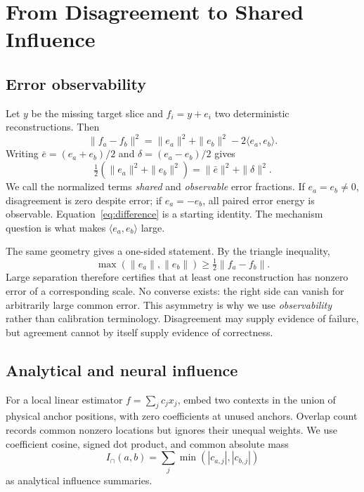 \documentclass[10pt,twocolumn,letterpaper]{article}
\begin{document}
\section{From Disagreement to Shared Influence}
\subsection{Error observability}
Let $y$ be the missing target slice and $f_i=y+e_i$ two deterministic reconstructions. Then
\begin{equation}
 \|f_a-f_b\|^2=\|e_a\|^2+\|e_b\|^2-2\langle e_a,e_b\rangle .
 \label{eq:difference}
\end{equation}
Writing $\bar e=(e_a+e_b)/2$ and $\delta=(e_a-e_b)/2$ gives
\begin{equation}
 \tfrac12(\|e_a\|^2+\|e_b\|^2)=\|\bar e\|^2+\|\delta\|^2 .
 \label{eq:decomp}
\end{equation}
We call the normalized terms \emph{shared} and \emph{observable} error fractions. If $e_a=e_b\neq0$, disagreement is zero despite error; if $e_a=-e_b$, all paired error energy is observable. Equation~\ref{eq:difference} is a starting identity. The mechanism question is what makes $\langle e_a,e_b\rangle$ large.

The same geometry gives a one-sided statement. By the triangle inequality,
\begin{equation}
 \max(\|e_a\|,\|e_b\|)\geq \tfrac12\|f_a-f_b\| .
 \label{eq:onesided}
\end{equation}
Large separation therefore certifies that at least one reconstruction has nonzero error of a corresponding scale. No converse exists: the right side can vanish for arbitrarily large common error. This asymmetry is why we use \emph{observability} rather than calibration terminology. Disagreement may supply evidence of failure, but agreement cannot by itself supply evidence of correctness.

\subsection{Analytical and neural influence}
For a local linear estimator $f=\sum_j c_jx_j$, embed two contexts in the union of physical anchor positions, with zero coefficients at unused anchors. Overlap count records common nonzero locations but ignores their unequal weights. We use coefficient cosine, signed dot product, and common absolute mass
\begin{equation}
 I_{\cap}(a,b)=\sum_j\min(|c_{a,j}|,|c_{b,j}|)
 \label{eq:mass}
\end{equation}
as analytical influence summaries.
\end{document}
